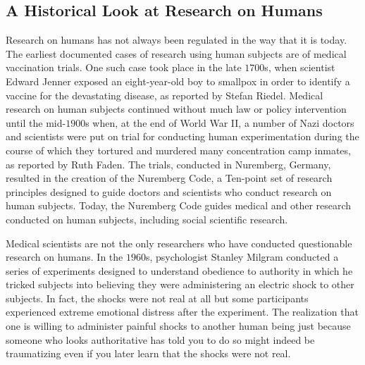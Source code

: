 \subsection{A Historical Look at Research on Humans}

Research on humans has not always been regulated in the way that it is today. The earliest documented cases of research using human subjects are of medical vaccination trials. One such case took place in the late $ 1700 $s, when scientist Edward Jenner exposed an eight-year-old boy to smallpox in order to identify a vaccine for the devastating disease, as reported by Stefan Riedel\cite{riedel2005edward}. Medical research on human subjects continued without much law or policy intervention until the mid-$ 1900 $s when, at the end of World War II, a number of Nazi doctors and scientists were put on trial for conducting human experimentation during the course of which they tortured and murdered many concentration camp inmates, as reported by Ruth Faden\cite{faden1986history}. The trials, conducted in Nuremberg, Germany, resulted in the creation of the Nuremberg Code, a Ten-point set of research principles designed to guide doctors and scientists who conduct research on human subjects. Today, the Nuremberg Code guides medical and other research conducted on human subjects, including social scientific research.

Medical scientists are not the only researchers who have conducted questionable research on humans. In the $ 1960 $s, psychologist Stanley Milgram conducted a series of experiments designed to understand obedience to authority in which he tricked subjects into believing they were administering an electric shock to other subjects\cite{milgram1963behavioral}. In fact, the shocks were not real at all but some participants experienced extreme emotional distress after the experiment. The realization that one is willing to administer painful shocks to another human being just because someone who looks authoritative has told you to do so might indeed be traumatizing even if you later learn that the shocks were not real.

